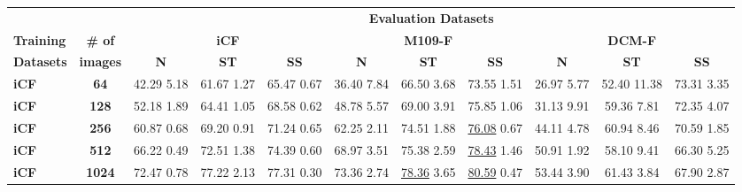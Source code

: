 \documentclass{article}
\begin{document}
\begin{table*}
\centering
\fontsize{8.5}{12}\selectfont
\begin{tabular}{l|c|ccc|ccc|ccc}
    \noalign{\smallskip}
    \cline{3-11}
    \noalign{\smallskip}
    \multicolumn{1}{c}{} & \multicolumn{1}{c}{} & \multicolumn{9}{c}{\textbf{Evaluation Datasets}} \\
    
    \noalign{\smallskip}
    \hline
    \noalign{\smallskip}
    
    \textbf{Training} & \textbf{\# of} & \multicolumn{3}{c|}{\textbf{iCF}} 
    & \multicolumn{3}{c|}{\textbf{M109-F}} 
    & \multicolumn{3}{c}{\textbf{DCM-F}}  \\
    \textbf{Datasets} & \textbf{images} 
    & \textbf{N} & \textbf{ST} & \textbf{SS}
    & \textbf{N} & \textbf{ST} & \textbf{SS}
    & \textbf{N} & \textbf{ST} & \textbf{SS} \\
    \noalign{\smallskip}
    \hline
    \noalign{\smallskip}

    \textbf{iCF} & \textbf{64}   
    & 42.29 {\tiny 5.18} 
    & 61.67 {\tiny 1.27} 
    & {65.47} {\tiny 0.67} 
    & 36.40 {\tiny 7.84} 
    & 66.50 {\tiny 3.68} 
    & {73.55} {\tiny 1.51} 
    & 26.97 {\tiny 5.77} 
    & 52.40 {\tiny 11.38}
    & {73.31} {\tiny 3.35}  \\
    
    \textbf{iCF} & \textbf{128}
    & 52.18 {\tiny 1.89}
    & 64.41 {\tiny 1.05} 
    & {68.58} {\tiny 0.62} 
    & 48.78 {\tiny 5.57} 
    & 69.00 {\tiny 3.91} 
    & {75.85} {\tiny 1.06} 
    & 31.13 {\tiny 9.91} 
    & 59.36 {\tiny 7.81} 
    & {72.35} {\tiny 4.07} \\
    
    \textbf{iCF} & \textbf{256}   
    & 60.87 {\tiny 0.68} 
    & 69.20 {\tiny 0.91} 
    & {71.24} {\tiny 0.65} 
    & 62.25 {\tiny 2.11} 
    & 74.51 {\tiny 1.88} 
    & {\underline{76.08}} {\tiny 0.67} 
    & 44.11 {\tiny 4.78} 
    & 60.94 {\tiny 8.46} 
    & {70.59} {\tiny 1.85} \\
    
    \textbf{iCF} & \textbf{512}   
    & 66.22 {\tiny 0.49}
    & 72.51 {\tiny 1.38} 
    & {74.39} {\tiny 0.60} 
    & 68.97 {\tiny 3.51} 
    & 75.38 {\tiny 2.59} 
    & {\underline{78.43}} {\tiny 1.46} 
    & 50.91 {\tiny 1.92} 
    & 58.10 {\tiny 9.41} 
    & {66.30} {\tiny 5.25} \\
    
    \textbf{iCF} & \textbf{1024}   
    & 72.47 {\tiny 0.78} 
    & 77.22 {\tiny 2.13} 
    & {77.31} {\tiny 0.30} 
    & 73.36 {\tiny 2.74} 
    & \underline{78.36} {\tiny 3.65} 
    & {\underline{80.59}} {\tiny 0.47} 
    & 53.44 {\tiny 3.90} 
    & 61.43 {\tiny 3.84} 
    & {67.90} {\tiny 2.87} \\
    

\end{tabular}
\end{table*}
\end{document}
